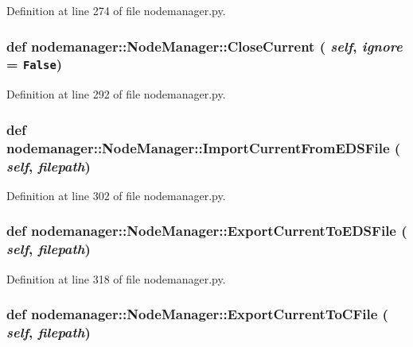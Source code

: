 Definition at line 274 of file nodemanager.py.\hypertarget{classnodemanager_1_1NodeManager_152b970b624b095775bd072d3eb2a8f2}{
\subsubsection[CloseCurrent]{\setlength{\rightskip}{0pt plus 5cm}def nodemanager::Node\-Manager::Close\-Current ( {\em self},  {\em ignore} = {\tt False})}}
\label{classnodemanager_1_1NodeManager_152b970b624b095775bd072d3eb2a8f2}




Definition at line 292 of file nodemanager.py.\hypertarget{classnodemanager_1_1NodeManager_b99cd2fc06950e3ffb19982a68205f4c}{
\subsubsection[ImportCurrentFromEDSFile]{\setlength{\rightskip}{0pt plus 5cm}def nodemanager::Node\-Manager::Import\-Current\-From\-EDSFile ( {\em self},  {\em filepath})}}
\label{classnodemanager_1_1NodeManager_b99cd2fc06950e3ffb19982a68205f4c}




Definition at line 302 of file nodemanager.py.\hypertarget{classnodemanager_1_1NodeManager_fc83d8f38a6c084d331829f0670c29e1}{
\subsubsection[ExportCurrentToEDSFile]{\setlength{\rightskip}{0pt plus 5cm}def nodemanager::Node\-Manager::Export\-Current\-To\-EDSFile ( {\em self},  {\em filepath})}}
\label{classnodemanager_1_1NodeManager_fc83d8f38a6c084d331829f0670c29e1}




Definition at line 318 of file nodemanager.py.\hypertarget{classnodemanager_1_1NodeManager_0951abe6610e7b5af6b5850fd4f8dcb5}{
\subsubsection[ExportCurrentToCFile]{\setlength{\rightskip}{0pt plus 5cm}def nodemanager::Node\-Manager::Export\-Current\-To\-CFile ( {\em self},  {\em filepath})}}
\label{classnodemanager_1_1NodeManager_0951abe6610e7b5af6b5850fd4f8dcb5}




